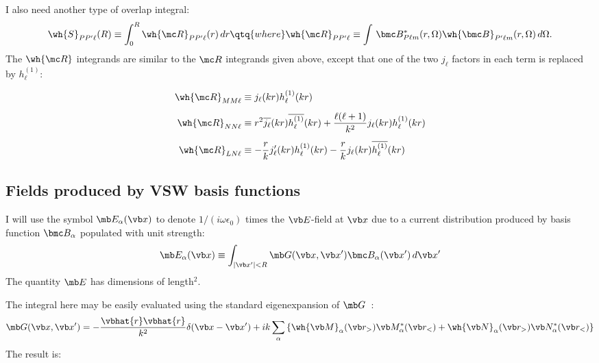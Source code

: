 \documentclass[letterpaper]{article}
\begin{document}
I also need another type of overlap integral:
$$
 \wh{S}_{PP^\prime \ell}(R) \equiv 
 \int_0^R \wh{\mc R}_{PP^\prime \ell}(r)\, dr
\qtq{where}
\wh{\mc R}_{PP^\prime\ell}\equiv \int\,
 \bmc B^*_{P\ell m}(r,\Omega)
 \wh{\bmc B}_{P^\prime\ell m}(r,\Omega)\,d\Omega.
$$
The $\wh{\mc R}$ integrands are similar to the $\mc R$ integrands
given above, except that one of the two $j_\ell$ factors in each 
term is replaced by $h_\ell^{(1)}$:

\begin{align*}
\wh{\mc R}_{MM\ell}&\equiv j_\ell(kr)h^{(1)}_\ell(kr)
\\[5pt]
\wh{\mc R}_{NN\ell}&\equiv 
  r^2 \overline{j_\ell}(kr) \overline{h^{(1)}_\ell}(kr)
 +\frac{\ell(\ell+1)}{k^2}j_\ell(kr) h^{(1)}_\ell(kr)
\\[5pt]
\wh{\mc R}_{LN\ell}&\equiv
  -\frac{r}{k}j^\prime_\ell(kr)h^{(1)}_\ell(kr)
  -\frac{r}{k}j_\ell(kr)\overline{h^{(1)}_\ell}(kr)
\end{align*}

\subsection{Fields produced by VSW basis functions}

I will use the symbol $\mb E_\alpha(\vb x)$ to denote
$1/(i\omega \epsilon_0)$ times the $\vb E$-field at $\vb x$
due to a current distribution produced by basis function $\bmc B_\alpha$
populated with unit strength:
$$ \mb E_\alpha(\vb x) \equiv
   \int_{|\vb x^\prime|<R} \mb G(\vb x, \vb x^\prime) \bmc B_\alpha(\vb x^\prime)
  \,d\vb x^\prime
$$
The quantity $\mb E$ has dimensions of length$^2$.

The integral here may be easily evaluated using the standard eigenexpansion
of $\mb G$~\cite{Tai,Collin}:
$$ \mb G(\vb x, \vb x^\prime)
   =-\frac{\vbhat{r} \vbhat{r}}{k^2}\delta(\vb x-\vb x^\prime)
   +ik\sum_{\alpha} 
     \left\{ \wh{\vb M}_\alpha(\vb r_>) \vb M_\alpha^*(\vb r_<)
            +\wh{\vb N}_\alpha(\vb r_>) \vb N_\alpha^*(\vb r_<)
     \right\}
$$
The result is:
\end{document}
